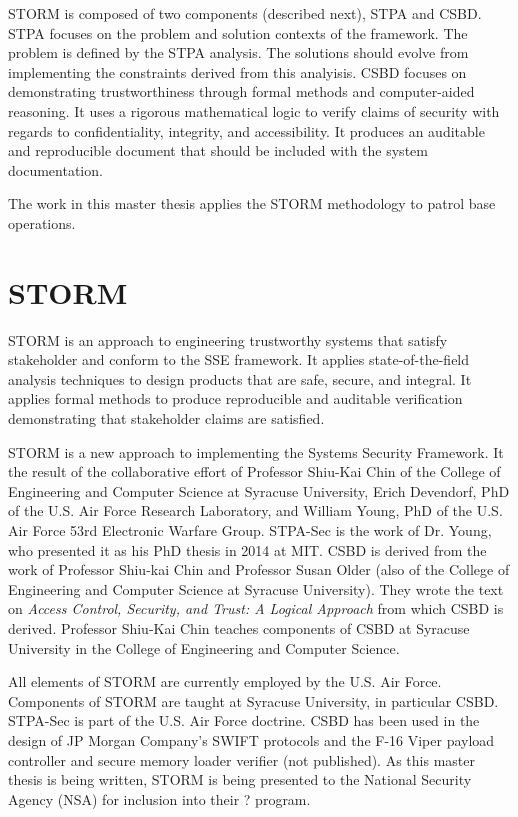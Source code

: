 \documentclass[../../main/main.tex]{subfiles}
\begin{document}
STORM is composed of two components (described next), STPA and CSBD.  STPA focuses on the problem and solution contexts of the framework.  The problem is defined by the STPA analysis.  The solutions should evolve from implementing the constraints derived from this analyisis. CSBD focuses on demonstrating trustworthiness through formal methods and computer-aided reasoning.  It uses a rigorous mathematical logic to verify claims of security with regards to confidentiality, integrity, and accessibility.  It produces an auditable and reproducible document that should be included with the system documentation.

The work in this master thesis applies the STORM methodology to patrol base operations. 


\section{STORM}\label{sec:storm}

STORM is an approach to engineering trustworthy systems that satisfy stakeholder and conform to the SSE framework.  It applies state-of-the-field analysis techniques to design products that are safe, secure, and integral.  It applies formal methods to produce reproducible and auditable verification demonstrating that stakeholder claims are satisfied.


STORM is a new approach to implementing the Systems Security Framework.  It the result of the collaborative effort of Professor Shiu-Kai Chin of the College of Engineering and Computer Science at Syracuse University, Erich Devendorf, PhD of the U.S. Air Force Research Laboratory, and William Young, PhD of the U.S. Air Force 53rd Electronic Warfare Group.  STPA-Sec is the work of Dr. Young, who presented it as his PhD thesis in 2014 at MIT.  CSBD is derived from the work of Professor Shiu-kai Chin and Professor Susan Older (also of the College of Engineering and Computer Science at Syracuse University).  They wrote the text on \textit{Access Control, Security, and Trust: A Logical Approach} \cite{csbd} from which CSBD is derived.  Professor Shiu-Kai Chin teaches components of CSBD at Syracuse University in the College of Engineering and Computer Science.  


All elements of STORM are currently employed by the U.S. Air Force.  Components of STORM are taught at Syracuse University, in particular CSBD.  STPA-Sec is part of the U.S. Air Force doctrine.  CSBD has been used in the design of JP Morgan Company's SWIFT protocols \cite{} and the F-16 Viper payload controller and secure memory loader verifier (not published). As this master thesis is being written, STORM is being presented to the National Security Agency (NSA) for inclusion into their ? program.
\end{document}

